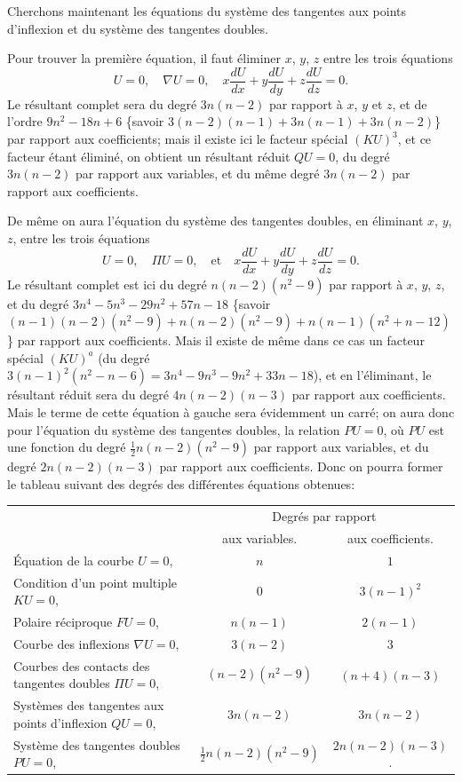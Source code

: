 \documentclass[11pt]{article}
\begin{document}
\medskip
Cherchons maintenant les \'equations du syst\`eme des tangentes aux points d'inflexion
et du syst\`eme des tangentes doubles.

\medskip
Pour trouver la premi\`ere \'equation, il faut \'eliminer $x$, $y$, $z$ entre les trois \'equations
\[
U = 0, \quad \nabla U = 0, \quad x\frac{dU}{dx} + y\frac{dU}{dy} + z\frac{dU}{dz} = 0.
\]
Le r\'esultant complet sera du degr\'e $3 n(n - 2)$ par rapport \`a $x$, $y$ et $z$, et de l'ordre
$9 n^{2} - 18 n + 6$ \{savoir $3(n - 2)(n - 1) + 3 n(n - 1) + 3 n(n - 2)$\} par rapport aux coefficients;
mais il existe ici le facteur sp\'ecial $(K U)^{3}$, et ce facteur \'etant \'elimin\'e, on obtient un
r\'esultant r\'eduit $Q U = 0$, du degr\'e $3 n(n - 2)$ par rapport aux variables, et du m\^eme
degr\'e $3 n(n - 2)$ par rapport aux coefficients.

\medskip
De m\^eme on aura l'\'equation du syst\`eme des tangentes doubles, en \'eliminant $x$,
$y$, $z$, entre les trois \'equations
\[
U = 0, \quad \Pi U = 0,\quad\text{et}\quad x\frac{dU}{dx} + y\frac{dU}{dy} + z\frac{dU}{dz} = 0.
\]
Le r\'esultant complet est ici du degr\'e $n(n - 2)(n^{2} - 9)$ par rapport \`a $x$, $y$, $z$, et du
degr\'e $3 n^{4} - 5 n^{3} - 29 n^{2} + 57 n - 18$ \{savoir $(n - 1)(n - 2)(n^{2} - 9) + n(n - 2)(n^{2} - 9) + n(n - 1)
(n^{2} + n - 12)$\} par rapport aux coefficients. Mais il existe de m\^eme dans ce cas un
facteur sp\'ecial $(K U)^{a}$ (du degr\'e $3(n - 1)^{2}(n^{2} - n - 6) = 3 n^{4} - 9 n^{3} - 9 n^{2} + 33 n - 18$),
et en l'\'eliminant, le r\'esultant r\'eduit sera du degr\'e $4 n(n - 2)(n - 3)$ par rapport aux
coefficients. Mais le terme de cette \'equation \`a gauche sera \'evidemment un carr\'e;
on aura donc pour l'\'equation du syst\`eme des tangentes doubles, la relation $P U = 0$,
o\`u $P U$ est une fonction du degr\'e $\tfrac{1}{2} n(n - 2)(n^{2} - 9)$ par rapport aux variables, et du
degr\'e $2 n(n - 2)(n - 3)$ par rapport aux coefficients. Donc on pourra former le tableau
suivant des degr\'es des diff\'erentes \'equations obtenues:

\medskip
\begin{center}
\begin{tabular}{lcc}
& \multicolumn{2}{c}{Degr\'es par rapport} \\
& aux variables. & aux coefficients. \\[2pt]
\'Equation de la courbe $U = 0$, & $n$ & $1$ \\
Condition d'un point multiple $K U = 0$, & $0$ & $3(n - 1)^{2}$ \\
Polaire r\'eciproque $F U = 0$, & $n(n - 1)$ & $2(n - 1)$ \\
Courbe des inflexions $\nabla U = 0$, & $3(n - 2)$ & $3$ \\
Courbes des contacts des tangentes doubles $\Pi U = 0$, & $(n - 2)(n^{2} - 9)$ & $(n + 4)(n - 3)$ \\
Syst\`emes des tangentes aux points d'inflexion $Q U = 0$, & $3 n(n - 2)$ & $3 n(n - 2)$ \\
Syst\`eme des tangentes doubles $P U = 0$, & $\tfrac{1}{2} n(n - 2)(n^{2} - 9)$ & $2 n(n - 2)(n - 3)$. \\
\end{tabular}
\end{center}
\end{document}
